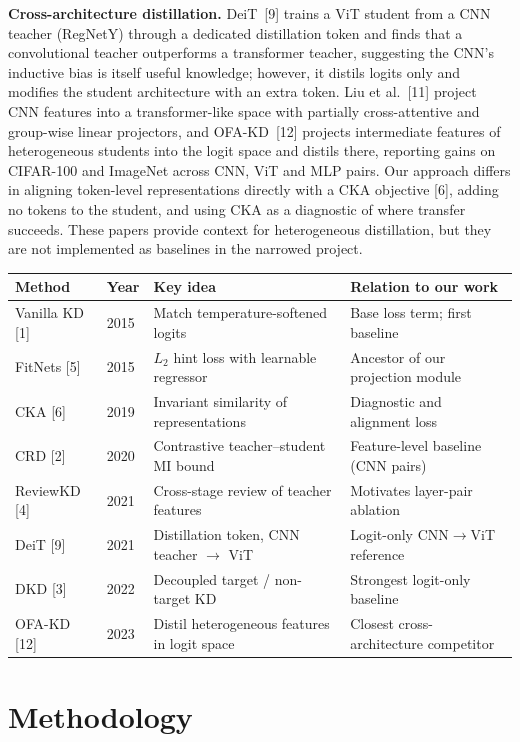 \documentclass[11pt, letterpaper]{article}
\begin{document}
\textbf{Cross-architecture distillation.} DeiT~[9] trains a ViT student from a
CNN teacher (RegNetY) through a dedicated distillation token and finds that a
convolutional teacher outperforms a transformer teacher, suggesting the CNN's
inductive bias is itself useful knowledge; however, it distils logits only and
modifies the student architecture with an extra token. Liu et al.~[11] project
CNN features into a transformer-like space with partially cross-attentive and
group-wise linear projectors, and OFA-KD~[12] projects intermediate features of
heterogeneous students into the logit space and distils there, reporting gains
on CIFAR-100 and ImageNet across CNN, ViT and MLP pairs. Our approach differs in
aligning token-level representations directly with a CKA objective [6], adding
no tokens to the student, and using CKA as a diagnostic of where transfer
succeeds. These papers provide context for heterogeneous distillation, but
they are not implemented as baselines in the narrowed project.

\begin{center}
\begin{tabular}{llp{4.2cm}p{4.2cm}}
\toprule
\textbf{Method} & \textbf{Year} & \textbf{Key idea} & \textbf{Relation to our work} \\
\midrule
Vanilla KD [1] & 2015 & Match temperature-softened logits & Base loss term; first baseline \\
FitNets [5] & 2015 & $L_2$ hint loss with learnable regressor & Ancestor of our projection module \\
CKA [6] & 2019 & Invariant similarity of representations & Diagnostic and alignment loss \\
CRD [2] & 2020 & Contrastive teacher--student MI bound & Feature-level baseline (CNN pairs) \\
ReviewKD [4] & 2021 & Cross-stage review of teacher features & Motivates layer-pair ablation \\
DeiT [9] & 2021 & Distillation token, CNN teacher $\rightarrow$ ViT & Logit-only CNN$\rightarrow$ViT reference \\
DKD [3] & 2022 & Decoupled target / non-target KD & Strongest logit-only baseline \\
OFA-KD [12] & 2023 & Distil heterogeneous features in logit space & Closest cross-architecture competitor \\
\bottomrule
\end{tabular}
\end{center}

\section{Methodology}
\end{document}
